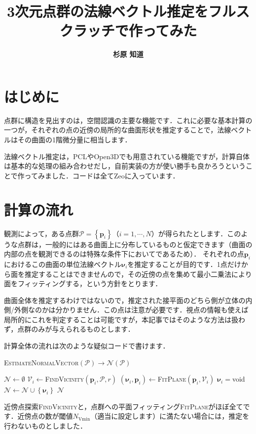 ﻿\documentclass[a4paper]{jsarticle}
\title{\bf 3次元点群の法線ベクトル推定をフルスクラッチで作ってみた}
\author{\Large{\bf 杉原 知道}}
\date{}
\begin{document}
\maketitle
\vspace{-\baselineskip}

\section{はじめに}

点群に構造を見出すのは，空間認識の主要な機能です．これに必要な基本計算の一つが，それぞれの点の近傍の局所的な曲面形状を推定することで，法線ベクトルはその曲面の1階微分量に相当します．

法線ベクトル推定は，PCLやOpen3Dでも用意されている機能ですが，計算自体は基本的な処理の組み合わせだし，自前実装の方が使い勝手も良かろうということで作ってみました．コードは全てZeoに入っています．


\section{計算の流れ}

観測によって，ある点群$\mathcal{P}=\left\{\boldsymbol{p}_{i}\right\}$（$i=1,\cdots,N$）が得られたとします．このような点群は，一般的にはある曲面上に分布しているものと仮定できます（曲面の内部の点を観測できるのは特殊な条件下においてであるため）．
それぞれの点$\boldsymbol{p}_{i}$におけるこの曲面の単位法線ベクトル$\boldsymbol{\nu}_{i}$を推定することが目的です．1点だけから面を推定することはできませんので，その近傍の点を集めて最小二乗法により面をフィッティングする，という方針をとります．

曲面全体を推定するわけではないので，推定された接平面のどちら側が立体の内側/外側なのかは分かりません．この点は注意が必要です．視点の情報も使えば局所的にこれを判定することは可能ですが，本記事ではそのような方法は扱わず，点群のみが与えられるものとします．

計算全体の流れは次のような疑似コードで書けます．
\begin{algorithm}[h]
\caption{\textsc{EstimateNormalVector}$(\mathcal{P})\rightarrow\mathcal{N}(\mathcal{P})$}
\begin{algorithmic}[1]
\State $\mathcal{N}\leftarrow\emptyset$
  \State $\mathcal{V}_{i}\leftarrow$\textsc{FindVicinity}$(\boldsymbol{p}_{i},\mathcal{P},r)$
    \State $(\boldsymbol{\nu}_{i},\boldsymbol{p}_{i})\leftarrow$\textsc{FitPlane}$(\boldsymbol{p}_{i},\mathcal{V}_{i})$
  \Else
    \State $\boldsymbol{\nu}_{i}=$void
  \EndIf
  \State $\mathcal{N}\leftarrow\mathcal{N}\cup\left\{\boldsymbol{\nu}_{i}\right\}$
\EndFor
{} $\mathcal{N}$
\end{algorithmic}
\end{algorithm}
近傍点探索\textsc{FindVicinity}と，点群への平面フィッティング\textsc{FitPlane}がほぼ全てです．近傍点の数が閾値$N_{\mathrm{Vmin}}$（適当に設定します）に満たない場合には，推定を行わないものとしました．
\end{document}
